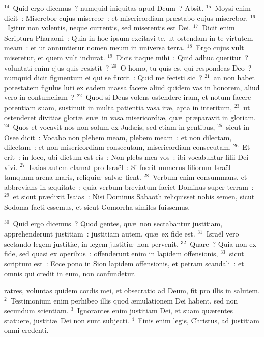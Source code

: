 ${}^{14}$~Quid ergo dicemus~? numquid iniquitas apud Deum~? Absit.
${}^{15}$~Moysi enim dicit~: Miserebor cujus misereor~: et misericordiam pr\ae stabo cujus miserebor.
${}^{16}$~Igitur non volentis, neque currentis, sed miserentis est Dei.
${}^{17}$~Dicit enim Scriptura Pharaoni~: Quia in hoc ipsum excitavi te, ut ostendam in te virtutem meam~: et ut annuntietur nomen meum in universa terra.
${}^{18}$~Ergo cujus vult miseretur, et quem vult indurat.
${}^{19}$~Dicis itaque mihi~: Quid adhuc queritur~? voluntati enim ejus quis resistit~?
${}^{20}$~O homo, tu quis es, qui respondeas Deo~? numquid dicit figmentum ei qui se finxit~: Quid me fecisti sic~?
${}^{21}$~an non habet potestatem figulus luti ex eadem massa facere aliud quidem vas in honorem, aliud vero in contumeliam~?
${}^{22}$~Quod si Deus volens ostendere iram, et notum facere potentiam suam, sustinuit in multa patientia vasa ir\ae , apta in interitum,
${}^{23}$~ut ostenderet divitias glori\ae\ su\ae\ in vasa misericordi\ae , qu\ae\ pr\ae paravit in gloriam.
${}^{24}$~Quos et vocavit nos non solum ex Jud\ae is, sed etiam in gentibus,
${}^{25}$~sicut in Osee dicit~: Vocabo non plebem meam, plebem meam~: et non dilectam, dilectam~: et non misericordiam consecutam, misericordiam consecutam.
${}^{26}$~Et erit~: in loco, ubi dictum est eis~: Non plebs mea vos~: ibi vocabuntur filii Dei vivi.
${}^{27}$~Isaias autem clamat pro Isra\"el~: Si fuerit numerus filiorum Isra\"el tamquam arena maris, reliqui\ae\ salv\ae\ fient.
${}^{28}$~Verbum enim consummans, et abbrevians in \ae quitate~: quia verbum breviatum faciet Dominus super terram~:
${}^{29}$~et sicut pr\ae dixit Isaias~: Nisi Dominus Sabaoth reliquisset nobis semen, sicut Sodoma facti essemus, et sicut Gomorrha similes fuissemus.


${}^{30}$~Quid ergo dicemus~? Quod gentes, qu\ae\ non sectabantur justitiam, apprehenderunt justitiam~: justitiam autem, qu\ae\ ex fide est.
${}^{31}$~Isra\"el vero sectando legem justiti\ae , in legem justiti\ae\ non pervenit.
${}^{32}$~Quare~? Quia non ex fide, sed quasi ex operibus~: offenderunt enim in lapidem offensionis,
${}^{33}$~sicut scriptum est~: Ecce pono in Sion lapidem offensionis, et petram scandali~: et omnis qui credit in eum, non confundetur.

\bchapter
{}ratres, voluntas quidem cordis mei, et obsecratio ad Deum, fit pro illis in salutem.
${}^{2}$~Testimonium enim perhibeo illis quod \ae mulationem Dei habent, sed non secundum scientiam.
${}^{3}$~Ignorantes enim justitiam Dei, et suam qu\ae rentes statuere, justiti\ae\ Dei non sunt subjecti.
${}^{4}$~Finis enim legis, Christus, ad justitiam omni credenti.


